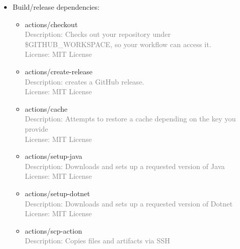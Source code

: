 \documentclass[10pt]{article}
\begin{document}
\begin{itemize}
\begin{itemize}
        \item Serilog.Sinks.Elasticsearch:
        \\\textcolor{gray}{Description: A writer (sink) for the Serilog logging framework.}
        \\\textcolor{gray}{License: Apache-2.0 license}
        
        \item Swashbuckle.AspNetCore:
        \\\textcolor{gray}{Description: Swagger tool for APIs build with ASP.NET Core \footnote{https://github.com/domaindrivendev/Swashbuckle.AspNetCore} }
        \\\textcolor{gray}{License: MIT license}



    \end{itemize}
      \item Build/release dependencies:
    \begin{itemize}
        \item actions/checkout
        \\\textcolor{gray}{Description: Checks out your repository under \$GITHUB_WORKSPACE, so your workflow can access it. }
        \\\textcolor{gray}{License: MIT License}
        \item actions/create-release
        \\\textcolor{gray}{Description: creates a GitHub release. }
        \\\textcolor{gray}{License: MIT License}
        \item actions/cache
        \\\textcolor{gray}{Description: Attempts to restore a cache depending on the key you provide }
        \\\textcolor{gray}{License: MIT License}
        \item actions/setup-java
        \\\textcolor{gray}{Description: Downloads and sets up a requested version of Java }
        \\\textcolor{gray}{License: MIT License}
        \item actions/setup-dotnet
        \\\textcolor{gray}{Description: Downloads and sets up a requested version of Dotnet }
        \\\textcolor{gray}{License: MIT License}
        \item actions/scp-action
        \\\textcolor{gray}{Description: Copies files and artifacts via SSH }

\end{itemize}
\end{itemize}
\end{document}
